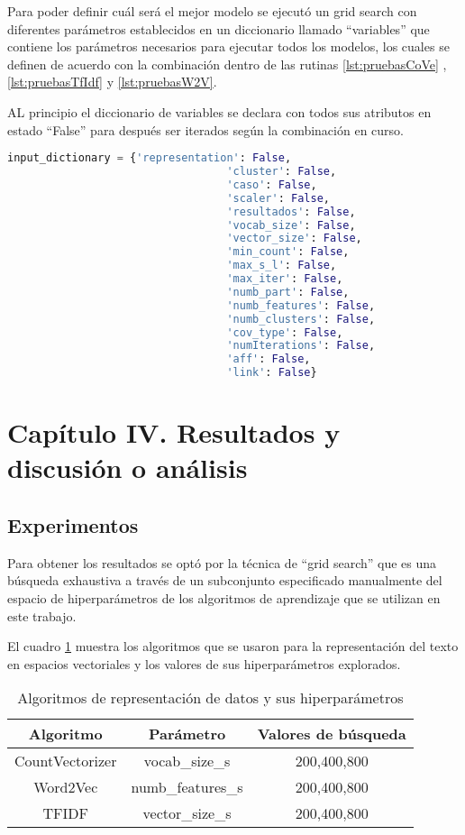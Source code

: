 \documentclass[12pt]{article}
\begin{document}
			Para poder definir cuál será el mejor modelo se ejecutó un grid search con diferentes parámetros establecidos en un diccionario llamado ``variables'' que contiene los parámetros necesarios para ejecutar todos los modelos, los cuales se definen de acuerdo con la combinación dentro de las rutinas \ref{lst:pruebasCoVe} , \ref{lst:pruebasTfIdf} y \ref{lst:pruebasW2V}.
			
			AL principio el diccionario de variables se declara con todos sus atributos en estado ``False'' para después ser iterados según la combinación en curso.             
		 	\begin{lstlisting}[language=Python, caption = Dicionario de variables]
			input_dictionary = {'representation': False,
					              'cluster': False,
					              'caso': False,
					              'scaler': False,
					              'resultados': False,
					              'vocab_size': False,
					              'vector_size': False,
					              'min_count': False,
					              'max_s_l': False,
					              'max_iter': False,
					              'numb_part': False,
					              'numb_features': False,
					              'numb_clusters': False,
					              'cov_type': False,
					              'numIterations': False,
					              'aff': False,
					              'link': False}
		 	\end{lstlisting}
								
	\newpage
	\section{Capítulo IV. Resultados y discusión o análisis}	
	
		\subsection{Experimentos}
		
		Para obtener los resultados se optó por la técnica de ``grid search'' que es una búsqueda exhaustiva a través de un subconjunto especificado manualmente del espacio de hiperparámetros de los algoritmos de aprendizaje que se utilizan en este trabajo.
		
		El cuadro \ref{tab:vector_space_representation_parameters} muestra los algoritmos que se usaron para la representación del texto en espacios vectoriales y los valores de sus hiperparámetros explorados.
		\begin{table}[H]
		\begin{tabular}{c|c|c}
		Algoritmo       & Parámetro         & Valores de búsqueda \\ \hline
		CountVectorizer & vocab\_size\_s    & 200,400,800         \\ 
		Word2Vec        & numb\_features\_s & 200,400,800         \\ 
		TFIDF           & vector\_size\_s   & 200,400,800         \\ 
		\end{tabular}
		\centering
		\caption{Algoritmos de representación de datos y sus hiperparámetros}
		\label{tab:vector_space_representation_parameters}
		\end{table}
		
\end{document}
